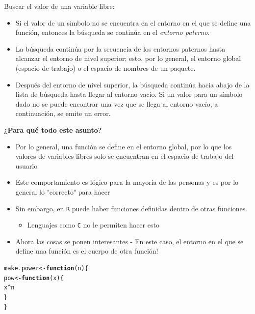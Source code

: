 \documentclass{article}\usepackage[]{graphicx}\usepackage[]{color}
\makeatletter
\newcommand{\hlopt}[1]{\textcolor[rgb]{0,0,0}{#1}}%
\newcommand{\hlstd}[1]{\textcolor[rgb]{0.345,0.345,0.345}{#1}}%
\newcommand{\hlkwa}[1]{\textcolor[rgb]{0.161,0.373,0.58}{\textbf{#1}}}%
\newcommand{\hlkwb}[1]{\textcolor[rgb]{0.69,0.353,0.396}{#1}}%
\newcommand{\hlkwc}[1]{\textcolor[rgb]{0.333,0.667,0.333}{#1}}%
\newenvironment{kframe}{%
 \def\at@end@of@kframe{}%
 \ifinner\ifhmode%
  \def\at@end@of@kframe{\end{minipage}}%
  \begin{minipage}{\columnwidth}%
 \fi\fi%
 \def\FrameCommand##1{\hskip\@totalleftmargin \hskip-\fboxsep
 \colorbox{shadecolor}{##1}\hskip-\fboxsep
     \hskip-\linewidth \hskip-\@totalleftmargin \hskip\columnwidth}%
 \MakeFramed {\advance\hsize-\width
   \@totalleftmargin\z@ \linewidth\hsize
   \@setminipage}}%
 {\par\unskip\endMakeFramed%
 \at@end@of@kframe}
\newenvironment{knitrout}{}{} %
\makeatother
\begin{document}
    Buscar el valor de una variable libre:
    \begin{itemize}
      \item Si el valor de un símbolo no se encuentra en el entorno en el que se define una función, entonces la búsqueda se continúa en el \emph{entorno paterno}.
      \item La búsqueda continúa por la secuencia de los entornos paternos hasta alcanzar el entorno de nivel superior; esto, por lo general, el entorno global (espacio de trabajo) o el espacio de nombres de un paquete.
      \item Después del entorno de nivel superior, la búsqueda continúa hacia abajo de la lista de búsqueda hasta llegar al entorno vacío. Si un valor para un símbolo dado no se puede encontrar una vez que se llega al entorno vacío, a continuación, se emite un error. 
    \end{itemize}

    \textbf{¿Para qué todo este asunto?}
    \begin{itemize}
      \item Por lo general, una función se define en el entorno global, por lo que los valores de variables libres solo se encuentran en el espacio de trabajo del usuario
      \item Este comportamiento es lógico para la mayoría de las personas y es por lo general lo "correcto" para hacer
      \item Sin embargo, en \texttt{R} puede haber funciones definidas dentro de otras funciones.
      \begin{itemize}
        \item Lenguajes como \texttt{C} no le permiten hacer esto
      \end{itemize}
      \item Ahora las cosas se ponen interesantes - En este caso, el entorno en el que se define una función es el cuerpo de otra función!
    \end{itemize}
    
\begin{knitrout}
\color{fgcolor}\begin{kframe}
\begin{alltt}
  \hlstd{make.power} \hlkwb{<-} \hlkwa{function}\hlstd{(}\hlkwc{n}\hlstd{)\{}
    \hlstd{pow} \hlkwb{<-} \hlkwa{function}\hlstd{(}\hlkwc{x}\hlstd{)\{}
      \hlstd{x}\hlopt{^}\hlstd{n}
    \hlstd{\}}
  \hlstd{\}}
\end{alltt}
\end{kframe}
\end{knitrout}
\end{document}
